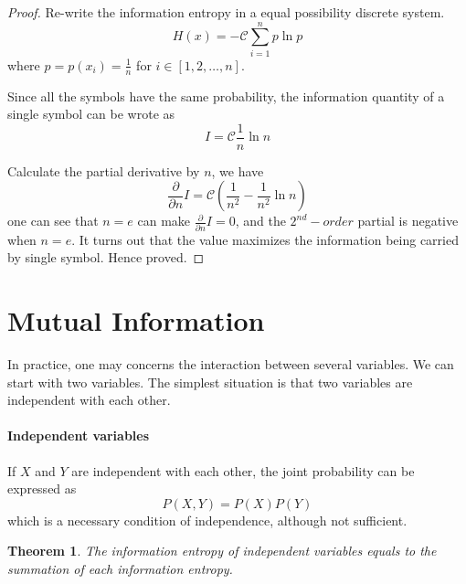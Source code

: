 \documentclass[a4paper]{article}
\newtheorem{theorem}{Theorem}[section]
\begin{document}
\begin{proof}
    Re-write the information entropy in a equal possibility discrete system.
    \begin{equation*}
        H(x) = - \mathcal{C} \sum_{i=1}^{n} p \ln{p}
    \end{equation*}
    where $p = p(x_{i}) = \frac{1}{n}$ for $i \in [1, 2, \dots, n]$.

    Since all the symbols have the same probability, the information quantity of a single symbol can be wrote as
    \begin{equation*}
        I = \mathcal{C} \frac{1}{n} \ln{n}
    \end{equation*}

    Calculate the partial derivative by $n$, we have
    \begin{equation*}
        \frac{\partial}{\partial{n}} I = \mathcal{C} (\frac{1}{n^{2}} - \frac{1}{n^{2}} \ln{n})
    \end{equation*}
    one can see that $n=e$ can make $\frac{\partial}{\partial{n}} I = 0$, and the $2^{nd}-order$ partial is negative when $n=e$.
    It turns out that the value maximizes the information being carried by single symbol.
    Hence proved.
\end{proof}

\section{Mutual Information}

In practice, one may concerns the interaction between several variables.
We can start with two variables.
The simplest situation is that two variables are independent with each other.

\paragraph{Independent variables}

If $X$ and $Y$ are independent with each other, the joint probability can be expressed as
\begin{equation}
    P(X, Y) = P(X) P(Y)
    \label{eq: Joint Probability of Independent Variables}
\end{equation}
which is a necessary condition of independence, although not sufficient.

\begin{theorem}
    The information entropy of independent variables equals to the summation of each information entropy.
\end{theorem}
\end{document}
